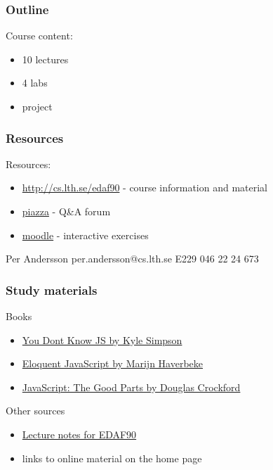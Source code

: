 \documentclass[aspectratio=1610]{beamer}
\begin{document}
\begin{frame}
  \frametitle{Outline}
Course content:
\begin{itemize}
\item 10 lectures 
\item 4 labs
\item project
\end{itemize}

\end{frame}

\begin{frame}
  \frametitle{Resources}
Resources:
\begin{itemize}
\item \href{http://cs.lth.se/edaf90}{http://cs.lth.se/edaf90} - course information and material 
\item \href{https://piazza.com/lu.se/winter2020/edaf90/home}{piazza} - Q\&A forum
\item \href{https://moodle.cs.lth.se/course/view.php?id=82}{moodle} - interactive exercises
\end{itemize}

Per Andersson
per.andersson@cs.lth.se
E229
046 22 24 673
\end{frame}

\begin{frame}
  \frametitle{Study materials}

Books
\begin{itemize}
\item \href{https://github.com/getify/You-Dont-Know-JS}{You Dont Know JS by Kyle Simpson} 
\item \href{https://eloquentjavascript.net/}{Eloquent JavaScript by Marijn Haverbeke}
\item \href{http://shop.oreilly.com/product/9780596517748.do}{JavaScript: The Good Parts by Douglas Crockford}
\end{itemize}

Other sources
\begin{itemize}
\item \href{http://fileadmin.cs.lth.se/cs/Education/EDAF90/lectures/lecture-notes.pdf}{Lecture notes for EDAF90}
\item links to online material on the home page
\end{itemize}

\end{frame}

\begin{frame}[plain]
  \endpage
\end{frame}

\end{document}
